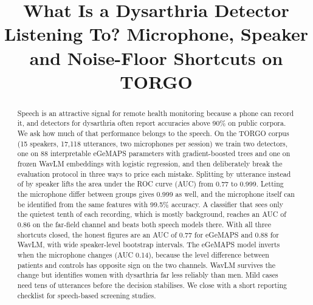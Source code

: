 \documentclass[conference]{IEEEtran}
\begin{document}
\title{What Is a Dysarthria Detector Listening To? Microphone, Speaker and Noise-Floor Shortcuts on TORGO}

\author{
\and
{}
\and
{}
}

\maketitle

\begin{abstract}
Speech is an attractive signal for remote health monitoring because a phone can record it, and detectors for dysarthria often report accuracies above 90\% on public corpora. We ask how much of that performance belongs to the speech. On the TORGO corpus (15 speakers, 17,118 utterances, two microphones per session) we train two detectors, one on 88 interpretable eGeMAPS parameters with gradient-boosted trees and one on frozen WavLM embeddings with logistic regression, and then deliberately break the evaluation protocol in three ways to price each mistake. Splitting by utterance instead of by speaker lifts the area under the ROC curve (AUC) from 0.77 to 0.999. Letting the microphone differ between groups gives 0.999 as well, and the microphone itself can be identified from the same features with 99.5\% accuracy. A classifier that sees only the quietest tenth of each recording, which is mostly background, reaches an AUC of 0.86 on the far-field channel and beats both speech models there. With all three shortcuts closed, the honest figures are an AUC of 0.77 for eGeMAPS and 0.88 for WavLM, with wide speaker-level bootstrap intervals. The eGeMAPS model inverts when the microphone changes (AUC 0.14), because the level difference between patients and controls has opposite sign on the two channels. WavLM survives the change but identifies women with dysarthria far less reliably than men. Mild cases need tens of utterances before the decision stabilises. We close with a short reporting checklist for speech-based screening studies.
\end{abstract}
\end{document}
